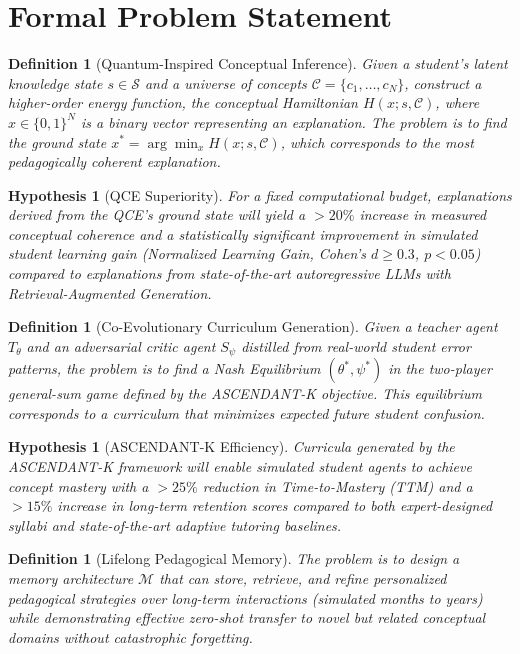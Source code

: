 \documentclass[11pt, letterpaper]{article}
\newtheorem{definition}[theorem]{Definition}
\newtheorem{hypothesis}[theorem]{Hypothesis}
\begin{document}
\section{Formal Problem Statement}

\begin{definition}[Quantum-Inspired Conceptual Inference]
Given a student's latent knowledge state $s \in \mathcal{S}$ and a universe of concepts $\mathcal{C} = \{c_1, \dots, c_N\}$, construct a higher-order energy function, the conceptual Hamiltonian $H(x; s, \mathcal{C})$, where $x \in \{0, 1\}^N$ is a binary vector representing an explanation. The problem is to find the ground state $x^* = \arg\min_{x} H(x; s, \mathcal{C})$, which corresponds to the most pedagogically coherent explanation.
\end{definition}

\begin{hypothesis}[QCE Superiority]
For a fixed computational budget, explanations derived from the QCE's ground state will yield a $>20\%$ increase in measured conceptual coherence and a statistically significant improvement in simulated student learning gain (Normalized Learning Gain, Cohen’s $d \ge 0.3$, $p < 0.05$) compared to explanations from state-of-the-art autoregressive LLMs with Retrieval-Augmented Generation.
\end{hypothesis}

\begin{definition}[Co-Evolutionary Curriculum Generation]
Given a teacher agent $T_\theta$ and an adversarial critic agent $S_\psi$ distilled from real-world student error patterns, the problem is to find a Nash Equilibrium $(\theta^*, \psi^*)$ in the two-player general-sum game defined by the ASCENDANT-K objective. This equilibrium corresponds to a curriculum that minimizes expected future student confusion.
\end{definition}

\begin{hypothesis}[ASCENDANT-K Efficiency]
Curricula generated by the ASCENDANT-K framework will enable simulated student agents to achieve concept mastery with a $>25\%$ reduction in Time-to-Mastery (TTM) and a $>15\%$ increase in long-term retention scores compared to both expert-designed syllabi and state-of-the-art adaptive tutoring baselines.
\end{hypothesis}

\begin{definition}[Lifelong Pedagogical Memory]
The problem is to design a memory architecture $\mathcal{M}$ that can store, retrieve, and refine personalized pedagogical strategies over long-term interactions (simulated months to years) while demonstrating effective zero-shot transfer to novel but related conceptual domains without catastrophic forgetting.
\end{definition}
\end{document}
